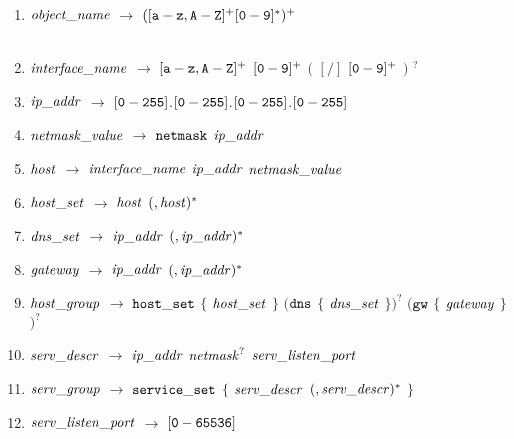 \begin{enumerate}
\item \noindent ${\it object\_name}$ $\rightarrow$ $([{\tt a-z,A-Z}]^{+}[{\tt 0-9}]^{*})^{+}$ \\\\ 
\item ${\it interface\_name}$ $\rightarrow$ $[{\tt a-z,A-Z}]^{+}$ ${\tt [0-9]^{+}}$  $($ $[/]$ ${\tt [0-9]^{+}}$ $)$ $^{?}$ \\ 
\item ${\it ip\_addr}$ $\rightarrow$ ${\tt [0-255]}$.${\tt [0-255]}$.${\tt [0-255]}$.${\tt [0-255]}$\\
\item ${\it netmask\_value}$ $\rightarrow$ ${\tt netmask}$ ${\it ip\_addr}$ \\
\item ${\it host}$ $\rightarrow$ ${\it interface\_name}$ ${\it ip\_addr}$ ${\it netmask\_value}$ \\


\item \noindent ${\it host\_set}$ $\rightarrow$ ${\it host}$ $({\it , host})^{*}$\\
\item ${\it dns\_set}$ $\rightarrow$  ${\it ip\_addr}$  $({\it , ip\_addr})^{*}$ \\
\item ${\it gateway}$ $\rightarrow$ ${\it ip\_addr}$ $({\it , ip\_addr})^{*}$\\

\item \noindent ${\it host\_group}$ $\rightarrow$ ${\tt host\_set}$ $\{$ ${\it host\_set}$ $\}$ $($${\tt dns}$ $\{$ ${\it dns\_set}$ $\}$$)^{?}$ $($${\tt gw}$ $\{$ ${\it gateway}$ $\}$$)^{?}$\\

\item \noindent ${\it serv\_descr}$ $\rightarrow$ ${\it ip\_addr}$ ${\it netmask}^{?}$ ${\it serv\_listen\_port}$ \\
\item ${\it serv\_group}$ $\rightarrow$ ${\tt service\_set}$ $\{$ ${\it serv\_descr}$ $({\it , serv\_descr})^{*}$ $\}$\\ 
\item ${\it serv\_listen\_port}$ $\rightarrow$ ${\tt [0-65536]}$\\\\


\end{enumerate}
